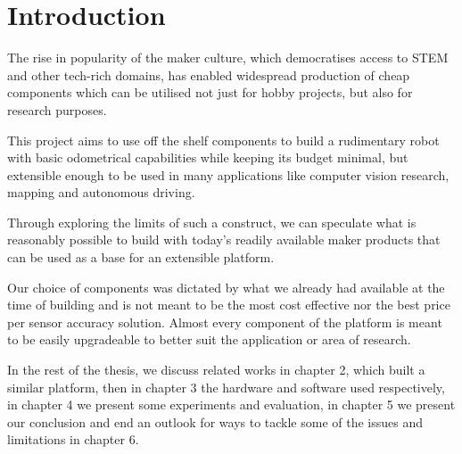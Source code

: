 \documentclass[class=article, crop=false]{standalone}
\begin{document}
\chapter{Introduction}\label{cha:introduction}

The rise in popularity of the maker culture, which democratises access to STEM and other tech-rich domains, has enabled widespread production of cheap components which can be utilised not just for hobby projects, but also for research purposes.

This project aims to use off the shelf components to build a rudimentary robot with basic odometrical capabilities while keeping its budget minimal, but extensible enough to be used in many applications like computer vision research, mapping and autonomous driving.

Through exploring the limits of such a construct, we can speculate what is reasonably possible to build with today's readily available maker products that can be used as a base for an extensible platform.

Our choice of components was dictated by what we already had available at the time of building and is not meant to be the most cost effective nor the best price per sensor accuracy solution. Almost every component of the platform is meant to be easily upgradeable to better suit the application or area of research.

In the rest of the thesis, we discuss related works in chapter 2, which built a similar platform, then in chapter 3 the hardware and software used respectively, in chapter 4 we present some experiments and evaluation, in chapter 5 we present our conclusion and end an outlook for ways to tackle some of the issues and limitations in chapter 6.

\clearpage
\end{document}
